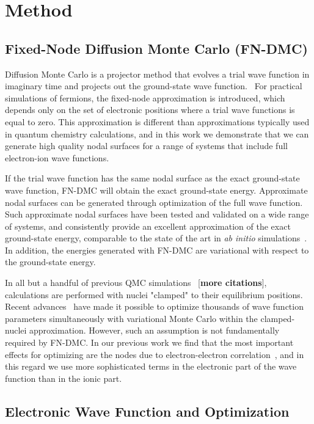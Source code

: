 \documentclass[pra,superscriptaddress,groupedaddress,twocolumn]{revtex4}
\begin{document}
\section{Method}
\subsection{Fixed-Node Diffusion Monte Carlo (FN-DMC)}
Diffusion Monte Carlo is a projector method that evolves a trial wave function in imaginary time and projects out the ground-state wave function.~\cite{Ceperley_QMC,QMC_Review,Morales_Review} For practical simulations of fermions, the fixed-node approximation is introduced, which depends only on the set of electronic positions where a trial wave functions is equal to zero.  This approximation is different than approximations typically used in quantum chemistry calculations, and in this work we demonstrate that we can generate high quality nodal surfaces for a range of systems that include full electron-ion wave functions. 

If the trial wave function has the same nodal surface as the exact ground-state wave function, FN-DMC will obtain the exact ground-state energy.  Approximate nodal surfaces can be generated through optimization of the full wave function. Such approximate nodal surfaces have been tested and validated on a wide range of systems, and consistently provide an excellent approximation of the exact ground-state energy,  comparable to the state of the art in \textit{ab initio} simulations~\cite{grossman1}. In addition, the energies generated with FN-DMC are variational with respect to the ground-state energy.

In all but a handful of previous QMC simulations~\cite{Ceperley_1987,Natoli_1993,Natoli_1995} [\textbf{more citations}], calculations are performed with nuclei "clamped" to their equilibrium positions. Recent advances~\cite{Nightingale_Linear,Umrigar_Linear,Brown_Bench} have made it possible to optimize thousands of wave function parameters simultaneously with variational Monte Carlo within the clamped-nuclei approximation. However, such an assumption is not fundamentally required by FN-DMC. In our previous work we find that the most important effects for optimizing are the nodes due to electron-electron correlation~\cite{Tubman_ECG}, and in this regard we use more sophisticated terms in the electronic part of the wave function than in the ionic part.

\subsection{Electronic Wave Function and Optimization}
\end{document}

